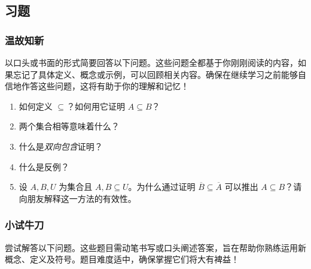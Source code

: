 \subsection{习题}

\subsubsection*{温故知新}

以口头或书面的形式简要回答以下问题。这些问题全都基于你刚刚阅读的内容，如果忘记了具体定义、概念或示例，可以回顾相关内容。确保在继续学习之前能够自信地作答这些问题，这将有助于你的理解和记忆！

\begin{enumerate}[label=(\arabic*)]
    \item 如何定义 $\subseteq$？如何用它证明 $A \subseteq B$？
    \item 两个集合相等意味着什么？
    \item 什么是\emph{双向包含}证明？
    \item 什么是反例？
    \item 设 $A,B,U$ 为集合且 $A,B \subseteq U$。为什么通过证明 $\overline{B} \subseteq \overline{A}$ 可以推出 $A \subseteq B$？请向朋友解释这一方法的有效性。
\end{enumerate}

\subsubsection*{小试牛刀}

尝试解答以下问题。这些题目需动笔书写或口头阐述答案，旨在帮助你熟练运用新概念、定义及符号。题目难度适中，确保掌握它们将大有裨益！


